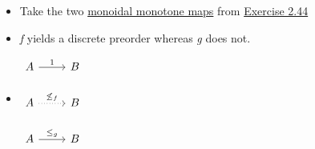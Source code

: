\begin{itemize}
    \item Take the two \hyperref[D2.41]{monoidal monotone maps} from \hyperref[E2.44]{Exercise 2.44}
    \item \emph{f} yields a discrete preorder whereas \emph{g} does not.
    \item $\begin{tikzcd}A \arrow[r, "1"] & B \\A \arrow[r, "\not\leq_f", dotted] & B \\A \arrow[r, "\leq_g"]             & B\end{tikzcd}$
  \end{itemize}

